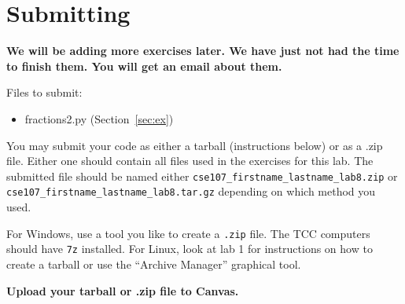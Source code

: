 \documentclass[11pt]{cselabheader}
\begin{document}
\pagebreak
\section{Submitting}

\begin{center}
  \textbf{We will be adding more exercises later. We have just not had the time
  to finish them. You will get an email about them.}
\end{center}

Files to submit:
\begin{itemize}
  \item fractions2.py (Section~\ref{sec:ex})
\end{itemize}

You may submit your code as either a tarball (instructions below) or as a .zip
file. Either one should contain all files used in the exercises for this lab.
The submitted file should be named either
\texttt{cse107\_firstname\_lastname\_lab8.zip} or
\texttt{cse107\_firstname\_lastname\_lab8.tar.gz} depending on which method you
used.

For Windows, use a tool you like to create a \texttt{.zip} file. The TCC
computers should have \texttt{7z} installed. For Linux, look at lab 1 for
instructions on how to create a tarball or use the ``Archive Manager'' graphical
tool.

\begin{center}
  \textbf{Upload your tarball or .zip file to Canvas.}
\end{center}
\end{document}
